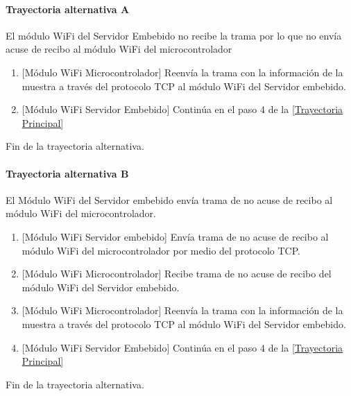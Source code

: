 \paragraph{Trayectoria alternativa A} \label{SUB-M-CU1.4:TA}
	El módulo WiFi del Servidor Embebido no recibe la trama por lo que no envía acuse de recibo al módulo WiFi del microcontrolador
	\begin{enumerate}[label=A\arabic*.]
		\item {[Módulo WiFi Microcontrolador]} Reenvía la trama con la información de la muestra a través del protocolo TCP al módulo WiFi del Servidor embebido.
		\item {[Módulo WiFi Servidor Embebido]} Continúa en el paso 4 de la \hyperref[SUB-M-CU1.4:TP]{[Trayectoria Principal]}
	\end{enumerate}
	Fin de la trayectoria alternativa.

\paragraph{Trayectoria alternativa B} \label{SUB-M-CU1.4:TB}
	El Módulo WiFi del Servidor embebido envía trama de no acuse de recibo al módulo WiFi del microcontrolador.
	\begin{enumerate}[label=B\arabic*.]
		\item {[Módulo WiFi Servidor embebido]} Envía trama de no acuse de recibo al módulo WiFi del microcontrolador por medio del protocolo TCP.
		\item {[Módulo WiFi Microcontrolador]} Recibe trama de no acuse de recibo del módulo WiFi del Servidor embebido.
		\item {[Módulo WiFi Microcontrolador]} Reenvía la trama con la información de la muestra a través del protocolo TCP al módulo WiFi del Servidor embebido.
		\item {[Módulo WiFi Servidor Embebido]} Continúa en el paso 4 de la \hyperref[SUB-M-CU1.4:TP]{[Trayectoria Principal]}
	\end{enumerate}
	Fin de la trayectoria alternativa.